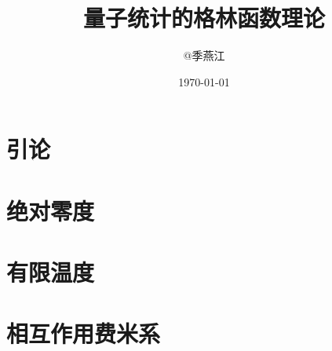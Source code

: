 \documentclass[twoside,b5paper,11pt]{report}
\begin{document}
\pagestyle{headings}

\title{量子统计的格林函数理论}
\author {@季燕江}

\date{\today}
\maketitle

\newpage



\newpage
\tableofcontents \setcounter{tocdepth}{1}
\newpage



\chapter{引论}









\chapter{绝对零度}











\chapter{有限温度}







\chapter{相互作用费米系}





%


%
\end{document}
